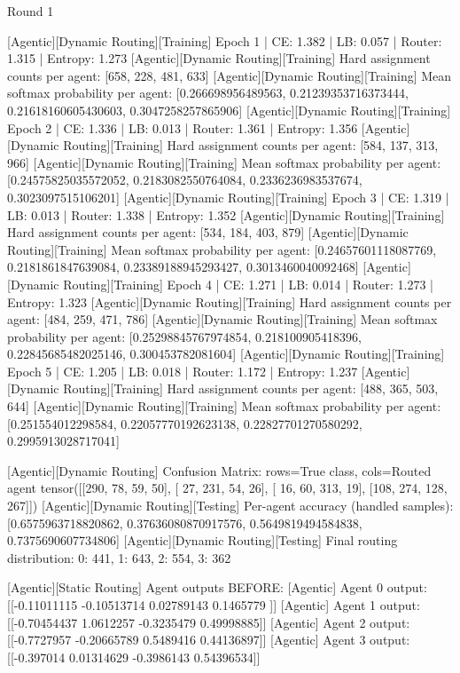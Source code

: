 Round 1

[Agentic][Dynamic Routing][Training] Epoch 1 | CE: 1.382 | LB: 0.057 | Router: 1.315 | Entropy: 1.273
[Agentic][Dynamic Routing][Training] Hard assignment counts per agent: [658, 228, 481, 633]
[Agentic][Dynamic Routing][Training] Mean softmax probability per agent: [0.266698956489563, 0.21239353716373444, 0.21618160605430603, 0.3047258257865906]
[Agentic][Dynamic Routing][Training] Epoch 2 | CE: 1.336 | LB: 0.013 | Router: 1.361 | Entropy: 1.356
[Agentic][Dynamic Routing][Training] Hard assignment counts per agent: [584, 137, 313, 966]
[Agentic][Dynamic Routing][Training] Mean softmax probability per agent: [0.24575825035572052, 0.2183082550764084, 0.2336236983537674, 0.3023097515106201]
[Agentic][Dynamic Routing][Training] Epoch 3 | CE: 1.319 | LB: 0.013 | Router: 1.338 | Entropy: 1.352
[Agentic][Dynamic Routing][Training] Hard assignment counts per agent: [534, 184, 403, 879]
[Agentic][Dynamic Routing][Training] Mean softmax probability per agent: [0.24657601118087769, 0.2181861847639084, 0.23389188945293427, 0.3013460040092468]
[Agentic][Dynamic Routing][Training] Epoch 4 | CE: 1.271 | LB: 0.014 | Router: 1.273 | Entropy: 1.323
[Agentic][Dynamic Routing][Training] Hard assignment counts per agent: [484, 259, 471, 786]
[Agentic][Dynamic Routing][Training] Mean softmax probability per agent: [0.25298845767974854, 0.218100905418396, 0.22845685482025146, 0.300453782081604]
[Agentic][Dynamic Routing][Training] Epoch 5 | CE: 1.205 | LB: 0.018 | Router: 1.172 | Entropy: 1.237
[Agentic][Dynamic Routing][Training] Hard assignment counts per agent: [488, 365, 503, 644]
[Agentic][Dynamic Routing][Training] Mean softmax probability per agent: [0.251554012298584, 0.22057770192623138, 0.22827701270580292, 0.2995913028717041]

[Agentic][Dynamic Routing] Confusion Matrix: rows=True class, cols=Routed agent
tensor([[290,  78,  59,  50],
[ 27, 231,  54,  26],
[ 16,  60, 313,  19],
[108, 274, 128, 267]])
[Agentic][Dynamic Routing][Testing] Per-agent accuracy (handled samples): [0.6575963718820862, 0.37636080870917576, 0.5649819494584838, 0.7375690607734806]
[Agentic][Dynamic Routing][Testing] Final routing distribution: {0: 441, 1: 643, 2: 554, 3: 362}

[Agentic][Static Routing] Agent outputs BEFORE:
[Agentic] Agent 0 output: [[-0.11011115 -0.10513714  0.02789143  0.1465779 ]]
[Agentic] Agent 1 output: [[-0.70454437  1.0612257  -0.3235479   0.49998885]]
[Agentic] Agent 2 output: [[-0.7727957  -0.20665789  0.5489416   0.44136897]]
[Agentic] Agent 3 output: [[-0.397014    0.01314629 -0.3986143   0.54396534]]

